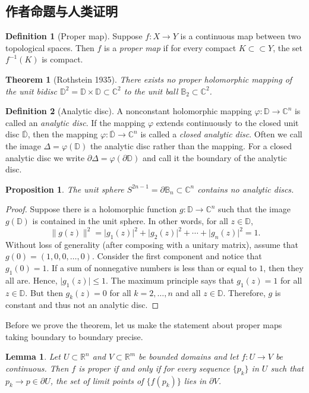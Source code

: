 \documentclass[UTF8,11pt]{ctexart}
\newtheorem*{theorem}{Theorem}
\newtheorem*{lemma}{Lemma}
\newtheorem*{proposition}{Proposition}
\theoremstyle{definition}
\newtheorem*{definition}{Definition}
\newcommand{\R}{\mathbb R}
\newcommand{\C}{\mathbb C}
\newcommand{\D}{\mathbb D}
\newcommand{\bB}{\mathbb B}
\newcommand{\sabs}[1]{\lvert#1\rvert}
\newcommand{\snorm}[1]{\lVert#1\rVert}
\newcommand{\widebar}[1]{\overline{#1}}
\begin{document}
\subsection*{作者命题与人类证明}
\begin{definition}[Proper map]
Suppose $f\colon X\to Y$ is a continuous map between two topological spaces. Then $f$ is a \emph{proper map} if for every compact $K\subset\subset Y$, the set $f^{-1}(K)$ is compact.
\end{definition}
\begin{theorem}[Rothstein 1935]\label{thm:Rothstein}
There exists no proper holomorphic mapping of the unit bidisc $\D^2=\D\times\D\subset\C^2$ to the unit ball $\bB_2\subset\C^2$.
\end{theorem}
\begin{definition}[Analytic disc]
A nonconstant holomorphic mapping $\varphi\colon\D\to\C^n$ is called an \emph{analytic disc}. If the mapping $\varphi$ extends continuously to the closed unit disc $\widebar\D$, then the mapping $\varphi\colon\widebar\D\to\C^n$ is called a \emph{closed analytic disc}.
Often we call the image $\Delta=\varphi(\D)$ the analytic disc rather than the mapping. For a closed analytic disc we write $\partial\Delta=\varphi(\partial\D)$ and call it the boundary of the analytic disc.
\end{definition}
\begin{proposition}\label{prop:noanaldiscinsphere}
The unit sphere $S^{2n-1}=\partial\bB_n\subset\C^n$ contains no analytic discs.
\end{proposition}
\begin{proof}
Suppose there is a holomorphic function $g\colon\D\to\C^n$ such that the image $g(\D)$ is contained in the unit sphere. In other words, for all $z\in\D$,
\[\snorm{g(z)}^2=\sabs{g_1(z)}^2+\sabs{g_2(z)}^2+\cdots+\sabs{g_n(z)}^2=1.\]
Without loss of generality (after composing with a unitary matrix), assume that $g(0)=(1,0,0,\ldots,0)$. Consider the first component and notice that $g_1(0)=1$. If a sum of nonnegative numbers is less than or equal to $1$, then they all are. Hence, $\sabs{g_1(z)}\leq1$. The maximum principle says that $g_1(z)=1$ for all $z\in\D$. But then $g_k(z)=0$ for all $k=2,\ldots,n$ and all $z\in\D$. Therefore, $g$ is constant and thus not an analytic disc.
\end{proof}
Before we prove the theorem, let us make the statement about proper maps taking boundary to boundary precise.
\begin{lemma}\label{lemma:bndrytobndry}
Let $U\subset\R^n$ and $V\subset\R^m$ be bounded domains and let $f\colon U\to V$ be continuous. Then $f$ is proper if and only if for every sequence $\{p_k\}$ in $U$ such that $p_k\to p\in\partial U$, the set of limit points of $\bigl\{f(p_k)\bigr\}$ lies in $\partial V$.
\end{lemma}
\end{document}
